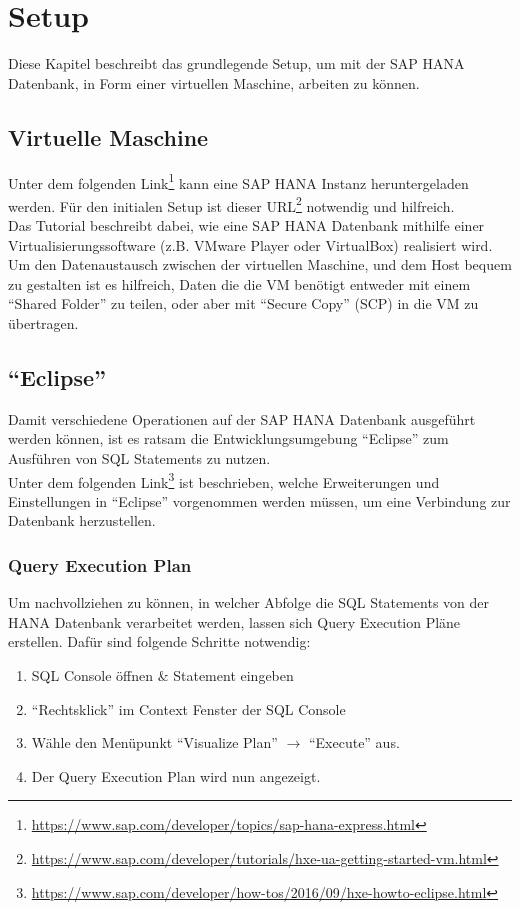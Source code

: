 \chapter{Setup}
Diese Kapitel beschreibt das grundlegende Setup, um mit der SAP HANA Datenbank, in Form einer virtuellen Maschine, arbeiten zu können.

\section{Virtuelle Maschine}
Unter dem folgenden Link\footnote{\url{https://www.sap.com/developer/topics/sap-hana-express.html}}  kann eine SAP HANA Instanz heruntergeladen werden. Für den initialen Setup ist dieser URL\footnote{\url{https://www.sap.com/developer/tutorials/hxe-ua-getting-started-vm.html}}  notwendig und hilfreich.\\
Das Tutorial beschreibt dabei, wie eine SAP HANA Datenbank mithilfe einer Virtualisierungssoftware (z.B. VMware Player oder VirtualBox) realisiert wird. Um den Datenaustausch zwischen der virtuellen Maschine, und dem Host bequem zu gestalten ist es hilfreich, Daten die die VM benötigt entweder mit einem \enquote{Shared Folder} zu teilen, oder aber mit \enquote{Secure Copy} (SCP) in die VM zu übertragen.


\section{\enquote{Eclipse}}
Damit verschiedene Operationen auf der SAP HANA Datenbank ausgeführt werden können, ist es ratsam die Entwicklungsumgebung \enquote{Eclipse} zum Ausführen von SQL Statements zu nutzen. \\Unter dem folgenden Link\footnote{\url{https://www.sap.com/developer/how-tos/2016/09/hxe-howto-eclipse.html}} ist beschrieben, welche Erweiterungen und Einstellungen in \enquote{Eclipse} vorgenommen werden müssen, um eine Verbindung zur Datenbank herzustellen.

\subsection{Query Execution Plan}
Um nachvollziehen zu können, in welcher Abfolge die SQL Statements von der HANA Datenbank verarbeitet werden, lassen sich Query Execution Pläne erstellen.
Dafür sind folgende Schritte notwendig:
\begin{enumerate}
	\item SQL Console öffnen \& Statement eingeben
	\item \enquote{Rechtsklick} im Context Fenster der SQL Console
	\item Wähle den Menüpunkt \enquote{Visualize Plan} $\rightarrow$ \enquote{Execute} aus.
	\item Der Query Execution Plan wird nun angezeigt.
\end{enumerate} 

